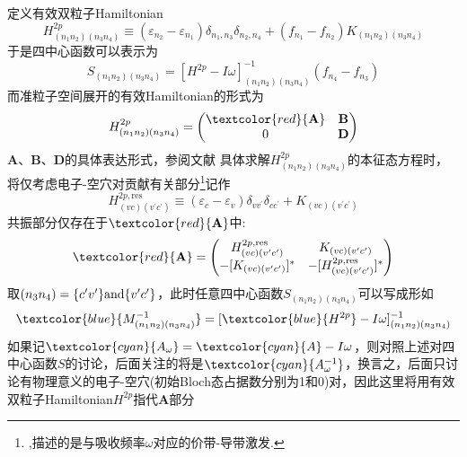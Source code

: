 {{{{\begin{displaymath}
	\end{displaymath}
	定义有效双粒子\textrm{Hamiltonian}
	\begin{displaymath}
		H_{(n_1n_2)(n_3n_4)}^{2p}\equiv(\varepsilon_{n_2}-\varepsilon_{n_1})\delta_{n_1,n_3}\delta_{n_2,n_4}+(f_{n_1}-f_{n_2})K_{(n_1n_2)(n_3n_4)}
	\end{displaymath}
	于是四中心函数可以表示为
	\begin{displaymath}
		S_{(n_1n_2)(n_3n_4)}=[H^{2p}-I\omega]_{(n_1n_2)(n_3n_4)}^{-1}(f_{n_4}-f_{n_3})
	\end{displaymath} 
	而准粒子空间展开的有效\textrm{Hamiltonian}的形式为
	\begin{displaymath}
		H_{(n_1n_2)(n_3n_4)}^{2p}=
		\begin{pmatrix}
			\textcolor{red}{\mathbf{A}} &\mathbf{B}\\
			0 &\mathbf{D}
		\end{pmatrix}
	\end{displaymath}
	$\mathbf{A}$、$\mathbf{B}$、$\mathbf{D}$的具体表达形式，参阅文献\cite{RMP74-601_2002}
\vskip 3pt
具体求解$H_{(n_1n_2)(n_3n_4)}^{2p}$的本征态方程时，将仅考虑电子-空穴对贡献有关部分\footnote{\fontsize{6.5pt}{4.2pt},描述的是与吸收频率$\omega$对应的价带-导带激发.}记作
\begin{displaymath}
	H_{(vc)(v^{\prime}c^{\prime})}^{2p,\mathrm{res}}\equiv(\varepsilon_c-\varepsilon_v)\delta_{vv^{\prime}}\delta_{cc^{\prime}}+K_{(vc)(v^{\prime}c^{\prime})}
\end{displaymath}
共振部分仅存在于$\textcolor{red}{\mathbf{A}}$中:
\begin{displaymath}
	\textcolor{red}{\mathbf{A}}=
\begin{pmatrix}
	H_{(vc)(v^{\prime}c^{\prime})}^{2p,\mathrm{res}} &K_{(vc)(v^{\prime}c^{\prime})}\\
	-[K_{(vc)(v^{\prime}c^{\prime})}]^{\ast} &-[H_{(vc)(v^{\prime}c^{\prime})}^{2p,\mathrm{res}}]^{\ast}\\
\end{pmatrix}
\end{displaymath}
取$(n_3n_4)=\{c^{\prime}v^{\prime}\}\mbox{\textrm{and}}\{v^{\prime}c^{\prime}\}$，此时任意四中心函数$S_{(n_1n_2)(n_3n_4)}$可以写成形如
\begin{displaymath}
	\textcolor{blue}{M_{(n_1n_2)(n_3n_4)}^{-1}}=[\textcolor{blue}{H^{2p}}-I\omega]_{(n_1n_2)(n_3n_4)}^{-1}
\end{displaymath}
如果记$\textcolor{cyan}{A_{\omega}}=\textcolor{cyan}{A}-I\omega$，则对照上述对四中心函数$S$的讨论，后面关注的将是$\textcolor{cyan}{A_{\omega}^{-1}}$，换言之，后面只讨论有物理意义的电子-空穴(初始\textrm{Bloch}态占据数分别为1和0)对，因此这里将用有效双粒子\textrm{Hamiltonian}$H^{2p}$指代$\mathbf{A}$部分
}}}}
